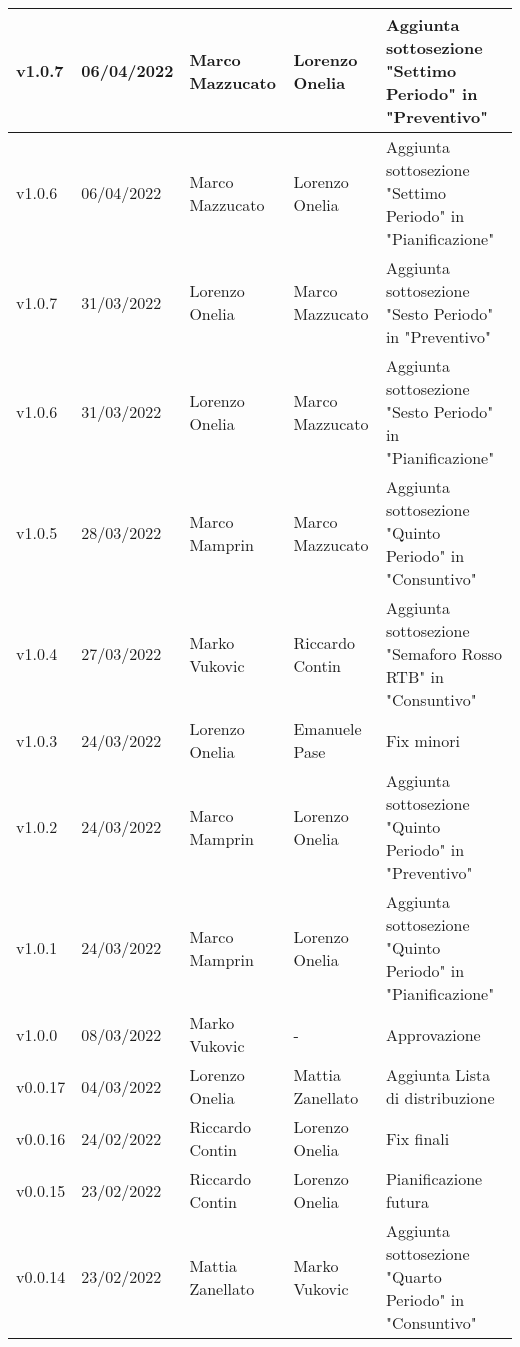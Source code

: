 {\begin{longtable}{|C{1.8cm}|C{2.1cm}|C{2cm}|C{2.4cm}|L{4.4cm}|}
  v1.0.7        & 06/04/2022    & Marco Mazzucato   &   Lorenzo Onelia   & Aggiunta sottosezione "Settimo Periodo" in "Preventivo" \\ \hline
  v1.0.6        & 06/04/2022    & Marco Mazzucato   &  Lorenzo Onelia    & Aggiunta sottosezione "Settimo Periodo" in "Pianificazione" \\ \hline
  v1.0.7        & 31/03/2022    & Lorenzo Onelia   &  Marco Mazzucato    & Aggiunta sottosezione "Sesto Periodo" in "Preventivo" \\ \hline
  v1.0.6        & 31/03/2022    & Lorenzo Onelia   &   Marco Mazzucato   & Aggiunta sottosezione "Sesto Periodo" in "Pianificazione" \\ \hline
  v1.0.5        & 28/03/2022    & Marco Mamprin   &  Marco Mazzucato    & Aggiunta sottosezione "Quinto Periodo" in "Consuntivo" \\ \hline
  v1.0.4        & 27/03/2022    & Marko Vukovic   &  Riccardo Contin    & Aggiunta sottosezione "Semaforo Rosso RTB" in "Consuntivo" \\ \hline
  v1.0.3        & 24/03/2022    & Lorenzo Onelia  & Emanuele Pase    & Fix minori                  \\ \hline
  v1.0.2        & 24/03/2022    & Marco Mamprin   &  Lorenzo Onelia    & Aggiunta sottosezione "Quinto Periodo" in "Preventivo" \\ \hline
  v1.0.1        & 24/03/2022    & Marco Mamprin   &  Lorenzo Onelia    & Aggiunta sottosezione "Quinto Periodo" in "Pianificazione" \\ \hline
  v1.0.0        & 08/03/2022    & Marko Vukovic   &  -                 & Approvazione \\ \hline
  v0.0.17       & 04/03/2022    & Lorenzo Onelia  & Mattia Zanellato     & Aggiunta Lista di distribuzione                  \\ \hline
  v0.0.16       & 24/02/2022     & Riccardo Contin  & Lorenzo Onelia                                & Fix finali \\ \hline
  v0.0.15       & 23/02/2022    & Riccardo Contin   & Lorenzo Onelia                  & Pianificazione futura \\ \hline
  v0.0.14       & 23/02/2022    & Mattia Zanellato  & Marko Vukovic                   & Aggiunta sottosezione "Quarto Periodo" in "Consuntivo" \\ \hline

\end{longtable}}

